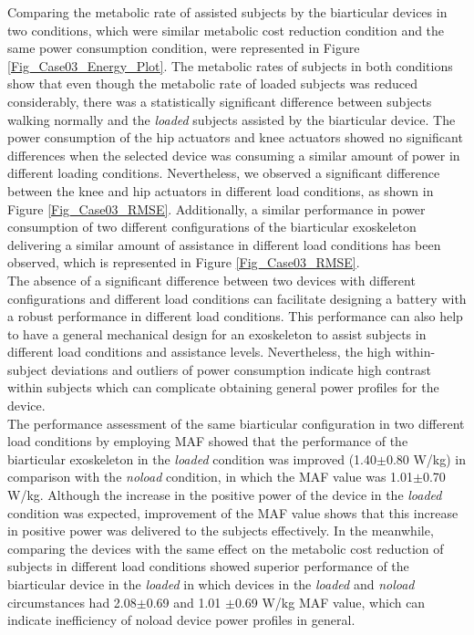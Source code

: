 \documentclass[10pt,letterpaper]{article}
\begin{document}
Comparing the metabolic rate of assisted subjects by the biarticular devices in two conditions, which were similar metabolic cost reduction condition and the same power consumption condition, were represented in Figure \ref{Fig_Case03_Energy_Plot}. The metabolic rates of subjects in both conditions show that even though the metabolic rate of loaded subjects was reduced considerably, there was a statistically significant difference between subjects walking normally and the {\it loaded} subjects assisted by the biarticular device. The power consumption of the hip actuators and knee actuators showed no significant differences when the selected device was consuming a similar amount of power in different loading conditions. Nevertheless, we observed a significant difference between the knee and hip actuators in different load conditions, as shown in Figure \ref{Fig_Case03_RMSE}. Additionally, a similar performance in power consumption of two different configurations of the biarticular exoskeleton delivering a similar amount of assistance in different load conditions has been observed, which is represented in Figure \ref{Fig_Case03_RMSE}.\\
The absence of a significant difference between two devices with different configurations and different load conditions can facilitate designing a battery with a robust performance in different load conditions. This performance can also help to have a general mechanical design for an exoskeleton to assist subjects in different load conditions and assistance levels. Nevertheless, the high within-subject deviations and outliers of power consumption indicate high contrast within subjects which can complicate obtaining general power profiles for the device.\\
The performance assessment of the same biarticular configuration in two different load conditions by employing MAF showed that the performance of the biarticular exoskeleton in the {\it loaded} condition was improved (1.40$\pm$0.80 W/kg) in comparison with the  {\it noload} condition, in which the MAF value was 1.01$\pm$0.70 W/kg. Although the increase in the positive power of the device in the {\it loaded} condition was expected, improvement of the MAF value shows that this increase in positive power was delivered to the subjects effectively. In the meanwhile, comparing the devices with the same effect on the metabolic cost reduction of subjects in different load conditions showed superior performance of the biarticular device in the {\it loaded} in which devices in the {\it loaded} and {\it noload} circumstances had  2.08$\pm$0.69 and 1.01 $\pm$0.69 W/kg MAF value, which can indicate inefficiency of noload device power profiles in general.\\
\end{document}
